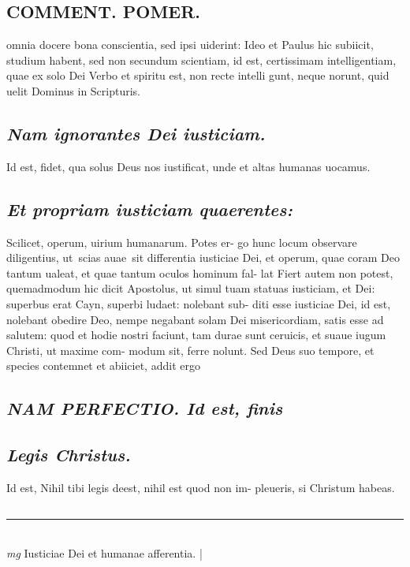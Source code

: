 \documentclass{article}
\begin{document}
\begin{pages}
\section*{COMMENT. POMER.  }\pstart omnia docere bona conscientia, sed ipsi uiderint: Ideo et Paulus hic subiicit, studium habent, sed non secundum scientiam, id est, certissimam intelligentiam, quae ex solo Dei Verbo et spiritu est, non recte intelli gunt, neque norunt, quid uelit Dominus in Scripturis.  \pend
{}
{}
\subsection*{\textit{Nam ignorantes Dei iusticiam. }}\pstart Id est, fidet, qua solus Deus nos iustificat, unde et altas humanas uocamus.   \pend
{}
{}
\subsection*{\textit{Et propriam iusticiam quaerentes: }}\pstart Scilicet, operum, uirium humanarum. Potes er- go hunc locum observare diligentius, ut scias auae sit differentia iusticiae Dei, et operum, quae coram Deo tantum ualeat, et quae tantum oculos hominum fal- lat Fiert autem non potest, quemadmodum hic dicit Apostolus, ut simul tuam statuas iusticiam, et Dei: superbus erat Cayn, superbi ludaet: nolebant sub- diti esse iusticiae Dei, id est, nolebant obedire Deo, nempe negabant solam Dei misericordiam, satis esse ad salutem: quod et hodie nostri faciunt, tam durae sunt ceruicis, et suaue iugum Christi, ut maxime com- modum sit, ferre nolunt. Sed Deus suo tempore, et species contemnet et abiiciet, addit ergo  \pend
{}
{}
\subsection*{\textit{NAM PERFECTIO. Id est, finis }}
{}
\subsection*{\textit{Legis Christus. }}\pstart Id est, Nihil tibi legis deest, nihil est quod non im- pleueris, si Christum habeas.  \pend
{}
{}
\subsection*{\textit{}}
\vspace{0.5cm}\noindent
\vspace{0.2cm}\rule{1cm}{0.2pt}\\ 
\hspace{0.2cm}\textit{mg}
\footnotesize Iusticiae Dei et humanae afferentia.  
\normalsize| 

\end{pages}
\end{document}
